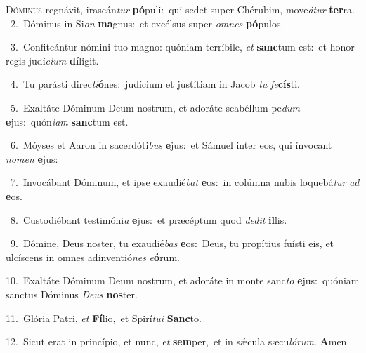 \lettrine{\initial\textcolor{\initialcolor}{D}}{óminus} regnávit, irascán\textit{tur} \textbf{pó}\-puli:~\star qui sedet super Chérubim, move\-\textit{á}\-\textit{tur} \textbf{ter}\-ra.\\
{\numbfont\textcolor{\numbcolor}{~2.}}~Dóminus in Si\textit{on} \textbf{ma}\-gnus:~\star et excélsus super \textit{om}\-\textit{nes} \textbf{pó}\-pulos.\par
{\numbfont\textcolor{\numbcolor}{~3.}}~Confiteántur nómini tuo magno: quóniam terríbile, \textit{et} \textbf{sanc}\-tum est:~\star et honor regis judí\-\textit{ci}\-\textit{um} \textbf{dí}\-ligit.\par
{\numbfont\textcolor{\numbcolor}{~4.}}~Tu parásti direc\-\textit{ti}\-\textbf{ó}nes:~\star judícium et justítiam in Jacob \textit{tu} \textit{fe}\-\textbf{cís}ti.\par
{\numbfont\textcolor{\numbcolor}{~5.}}~Exaltáte Dóminum Deum nostrum, et adoráte scabéllum pe\textit{dum} \textbf{e}\-jus:~\star quón\-\textit{i}\-\textit{am} \textbf{sanc}\-tum est.\par
{\numbfont\textcolor{\numbcolor}{~6.}}~Móyses et Aaron in sacerdóti\textit{bus} \textbf{e}\-jus:~\star et Sámuel inter eos, qui ínvocant \textit{no}\-\textit{men} \textbf{e}\-jus:\par
{\numbfont\textcolor{\numbcolor}{~7.}}~Invocábant Dóminum, et ipse exaudié\textit{bat} \textbf{e}\-os:~\star in colúmna nubis loquebá\textit{tur} \textit{ad} \textbf{e}\-os.\par
{\numbfont\textcolor{\numbcolor}{~8.}}~Custodiébant testimóni\textit{a} \textbf{e}\-jus:~\star et præcéptum quod \textit{de}\-\textit{dit} \textbf{il}\-lis.\par
{\numbfont\textcolor{\numbcolor}{~9.}}~Dómine, Deus noster, tu exaudié\textit{bas} \textbf{e}\-os:~\star Deus, tu propítius fuísti eis, et ulcíscens in omnes adinventió\textit{nes} \textit{e}\-\textbf{ó}rum.\par
{\numbfont\textcolor{\numbcolor}{10.}}~Exaltáte Dóminum Deum nostrum, et adoráte in monte sanc\textit{to} \textbf{e}\-jus:~\star quóniam sanctus Dóminus \textit{De}\-\textit{us} \textbf{nos}\-ter.\par
{\numbfont\textcolor{\numbcolor}{11.}}~Glória Patri, \textit{et} \textbf{Fí}\-lio,~\star et Spirí\-\textit{tu}\-\textit{i} \textbf{Sanc}\-to.\par
{\numbfont\textcolor{\numbcolor}{12.}}~Sicut erat in princípio, et nunc, \textit{et} \textbf{sem}\-per,~\star et in sǽcula sæcu\-\textit{ló}\-\textit{rum}. \textbf{A}\-men.\par
